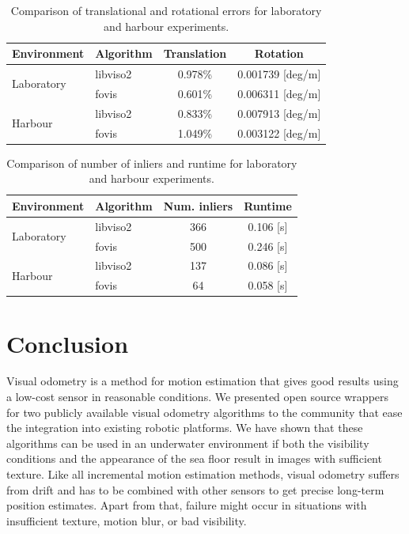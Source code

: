 \documentclass[conference]{IEEEtran}
\begin{document}
\begin{table}[!t]
  \renewcommand{\arraystretch}{1.3}
  \caption{Comparison of translational and rotational errors for laboratory and harbour experiments.}
  \label{results-errors}
  \centering
  \begin{tabular}{|l|l|c|c|} \hline
    \textbf{Environment} & \textbf{Algorithm} & \textbf{Translation} & \textbf{Rotation}\\ \hline
    \multirow{2}{*}{Laboratory} & libviso2 & 0.978\% & 0.001739 [deg/m] \\
                                & fovis    & 0.601\% & 0.006311 [deg/m] \\ \hline
    \multirow{2}{*}{Harbour}    & libviso2 & 0.833\% & 0.007913 [deg/m] \\
                                & fovis    & 1.049\% & 0.003122 [deg/m] \\ \hline
  \end{tabular} 
\end{table}

\begin{table}[!t]
  \renewcommand{\arraystretch}{1.3}
  \caption{Comparison of number of inliers and runtime for laboratory and harbour experiments.}
  \label{results-runtime}
  \centering
  \begin{tabular}{|l|l|c|c|} \hline
    \textbf{Environment} & \textbf{Algorithm} & \textbf{Num. inliers} & \textbf{Runtime}\\ \hline
    \multirow{2}{*}{Laboratory} & libviso2 & 366 & 0.106 [s] \\
                                & fovis    & 500 & 0.246 [s] \\ \hline
    \multirow{2}{*}{Harbour}    & libviso2 & 137 & 0.086 [s] \\
                                & fovis    & 64 & 0.058 [s] \\ \hline
  \end{tabular} 
\end{table}

\section{Conclusion
  \label{conclusion}
}

Visual odometry is a method for motion estimation that gives good results using a low-cost sensor in reasonable conditions. We presented open source wrappers for two publicly available visual odometry algorithms to the community that ease the integration into existing robotic platforms.
We have shown that these algorithms can be used in an underwater environment if both the visibility conditions and the appearance of the sea floor result in images with sufficient texture. Like all incremental motion estimation methods, visual odometry suffers from drift and has to be combined with other sensors to get precise long-term position estimates. Apart from that, failure might occur in situations with insufficient texture, motion blur, or bad visibility.
\end{document}
